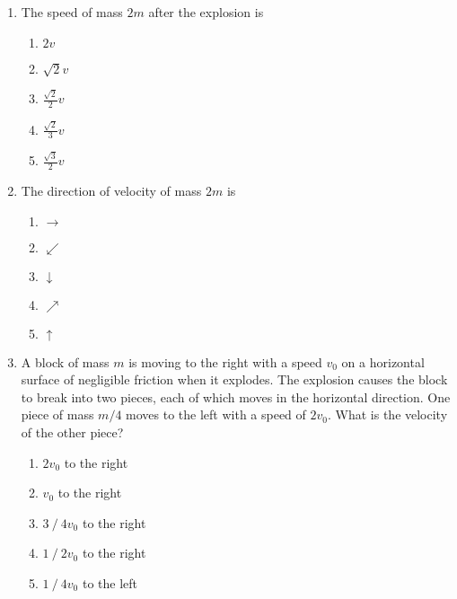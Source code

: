\documentclass{../../../oss-apphys}
\begin{document}
\begin{multicols}{2}
  \begin{enumerate}[leftmargin=18pt,resume]
  \item The speed of mass $2m$ after the explosion is
    \label{explode1}
    \begin{enumerate}[nosep,leftmargin=18pt,label=(\Alph*)]
    \item $2v$
    \item $\displaystyle\sqrt{2}v$
    \item $\displaystyle\frac{\sqrt{2}}{2}v$
    \item $\displaystyle\frac{\sqrt{2}}{3}v$
    \item $\displaystyle\frac{\sqrt{3}}{2}v$
    \end{enumerate}
    
  \item The direction of velocity of mass $2m$ is
    \label{explode2}
    \begin{enumerate}[nosep,leftmargin=18pt,label=(\Alph*)]
    \item $\rightarrow$
    \item $\swarrow$
    \item $\downarrow$
    \item $\nearrow$
    \item $\uparrow$
    \end{enumerate}
  

    

  \item A block of mass $m$ is moving to the right with a speed $v_0$ on a
    horizontal surface of negligible friction when it explodes. The explosion
    causes the block to break into two pieces, each of which moves in the
    horizontal direction. One piece of mass $m/4$ moves to the left with a
    speed of $2v_0$. What is the velocity of the other piece?
    \begin{enumerate}[nosep,leftmargin=18pt,label=(\Alph*)]
    \item$2v_0$ to the right
    \item$v_0$ to the right
    \item$3⁄4 v_0$ to the right
    \item$1⁄2 v_0$ to the right
    \item$1⁄4 v_0$ to the left
    \end{enumerate}
  \end{enumerate}
  \columnbreak
  

\end{multicols}
\end{document}

